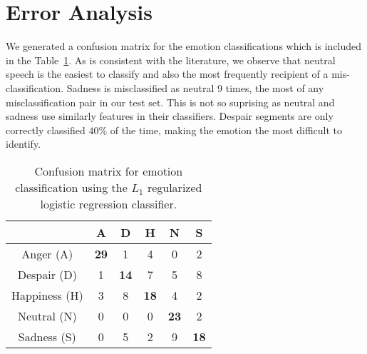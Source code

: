 \documentclass[twocolumn, 11pt]{article}
\begin{document}
\section{Error Analysis}

We generated a confusion matrix for the emotion classifications which is
included in the Table~\ref{tab:confusion}. As is consistent with the
literature, we observe that neutral speech is the easiest to classify and also
the most frequently recipient of a mis-classification. Sadness is misclassified
as neutral 9 times, the most of any misclassification pair in our test set.
This is not so suprising as neutral and sadness use similarly features in their
classifiers.  Despair segments are only correctly classified $40\%$ of the
time, making the emotion the most difficult to identify.

\begin{table}[tbp]
\centering
\begin{tabular}{*{6}{c}}\toprule
&A & D & H & N & S  \\ \midrule
Anger (A) & \bf 29 & 1 & 4 & 0 & 2 \\
Despair (D) & 1 & \bf 14 & 7 & 5 & 8 \\
Happiness (H) & 3 & 8 & \bf 18 & 4 & 2\\
Neutral (N) & 0 & 0 & 0 & \bf 23 & 2\\
Sadness (S) & 0 & 5 & 2 & 9 & \bf 18\\
\bottomrule
\end{tabular}
\caption{\footnotesize Confusion matrix for emotion classification using the
$L_1$ regularized logistic regression classifier.}\label{tab:confusion}
\end{table}
\end{document}
